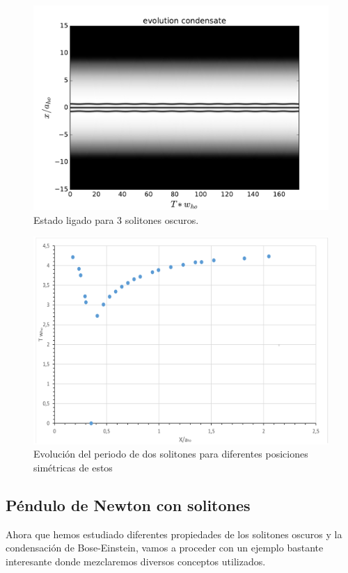 \documentclass[12pt]{article}
\begin{document}
  \begin{figure}[tb]
 	\centering
 	\includegraphics[width=0.9\linewidth]{stati_3.pdf}
 	\caption{Estado ligado para 3 solitones oscuros.}
 	\label{Fig:stati_3}
 \end{figure}
 
 \begin{figure}[tb]
 	\centering
 	\includegraphics[width=0.9\linewidth]{periodo.pdf}
 	\caption{Evoluci\'on del periodo de dos solitones para diferentes posiciones sim\'etricas de estos}
 	\label{Fig:per}
 \end{figure}

\subsection{P\'endulo de Newton con solitones}
Ahora que hemos estudiado diferentes propiedades de los solitones oscuros y la condensaci\'on de Bose-Einstein, vamos a proceder con un ejemplo bastante interesante donde mezclaremos diversos conceptos utilizados.
\end{document}
